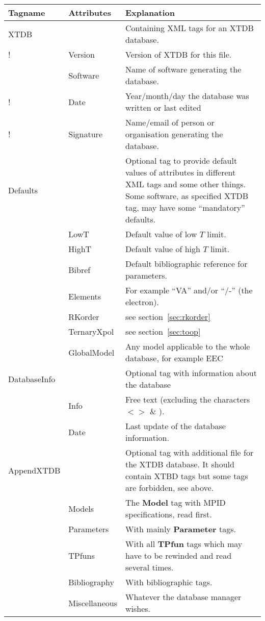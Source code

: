 \documentclass{article}
\begin{document}
\begin{tabular}{|p{} p{} p{}|}\hline
  Tagname & Attributes & Explanation\\\hline

  XTDB    &         & Containing XML tags for an XTDB database.\\
!          & Version & Version of XTDB for this file.\\
           &Software & Name of software generating the database.\\
!          &Date     & Year/month/day the database was written or last edited\\
!          &Signature & Name/email of person or organisation generating the database.\\\hline
  
  Defaults & & Optional tag to provide default values of attributes in
  different XML tags and some other things.  Some software, as
  specified XTDB tag,  may have some ``mandatory'' defaults.\\
           & LowT & Default value of low $T$ limit.\\
           & HighT & Default value of high $T$ limit.\\
           & Bibref & Default bibliographic reference for parameters. \\
           & Elements & For example ``VA'' and/or ``/-'' (the electron).\\
           & RKorder & see section~\ref{sec:rkorder} \\
           & TernaryXpol & see section~\ref{sec:toop} \\
           & GlobalModel & Any model applicable to the whole database,
                 for example EEC~\cite{21Sun}\\\hline

  DatabaseInfo & & Optional tag with information about the database\\
           & Info & Free text (excluding the characters $< >$ \& ).\\
           & Date & Last update of the database information.\\\hline

  AppendXTDB & & Optional tag with additional file for the XTDB database.  
              It should contain XTBD tags but some tags are forbidden,
              see above.\\
         & Models & The {\bf Model} tag with MPID specifications, read first.\\
         & Parameters & With mainly {\bf Parameter} tags.\\
         & TPfuns & With all {\bf TPfun} tags which may have to be rewinded and
                    read several times.\\
         & Bibliography & With bibliographic tags.\\
         & Miscellaneous & Whatever the database manager wishes.\\\hline
\end{tabular}
\end{document}
